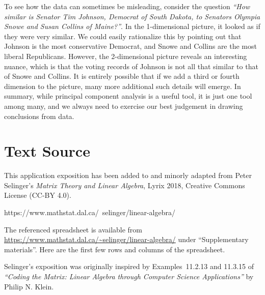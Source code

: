 \documentclass{ximera}
\begin{document}
To see how the data can sometimes be misleading, consider the question
{\em ``How similar is Senator Tim Johnson, Democrat of South Dakota,
  to Senators Olympia Snowe and Susan Collins of Maine?''}. In the
1-dimensional picture, it looked as if they were very similar. We
could easily rationalize this by pointing out that Johnson is the most
conservative Democrat, and Snowe and Collins are the most liberal
Republicans. However, the 2-dimensional picture reveals an interesting
nuance, which is that the voting records of Johnson is not all that
similar to that of Snowe and Collins. It is entirely possible that if
we add a third or fourth dimension to the picture, many more
additional such details will emerge. In summary, while principal
component analysis is a useful tool, it is just one tool among many,
and we always need to exercise our best judgement in drawing
conclusions from data.

\section*{Text Source}

This application exposition has been added to and minorly adapted from Peter Selinger's {\it Matrix Theory and Linear Algebra}, Lyrix 2018, Creative Commons License (CC-BY 4.0).
    
https://www.mathstat.dal.ca/~selinger/linear-algebra/

The referenced spreadsheet is available from
\url{https://www.mathstat.dal.ca/~selinger/linear-algebra/} under
``Supplementary materials''. Here are the first few rows and columns
of the spreadsheet.

Selinger's exposition was originally inspired by Examples~11.2.13
and 11.3.15 of {\em ``Coding the Matrix: Linear Algebra through
  Computer Science Applications''} by Philip N. Klein.
\end{document}

